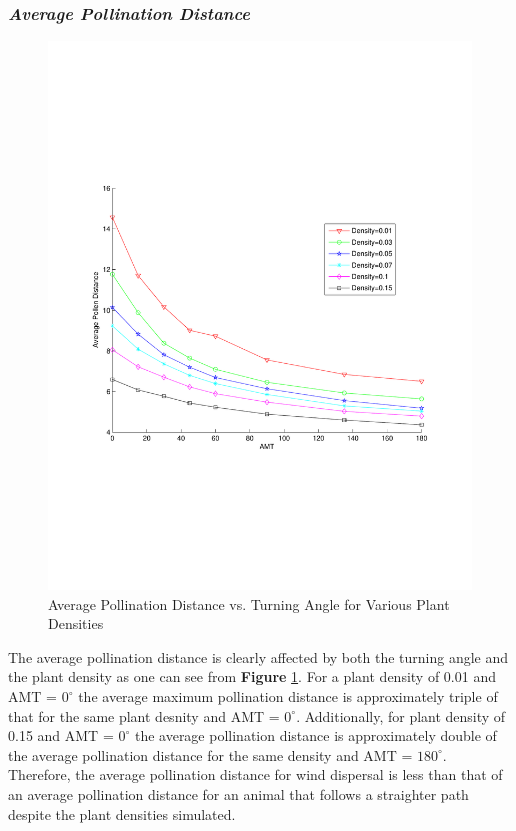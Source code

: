 \documentclass[preprint,12pt]{elsarticle}
\numberwithin{equation}{subsection}
\begin{document}
\subsubsection*{\emph{Average Pollination Distance}}
\begin{figure}
  \begin{center}
  \includegraphics[width=1.0\textwidth]{PollenDVsAMT.pdf}
  \end{center}
  \caption{\small Average Pollination Distance vs. Turning Angle for Various
Plant Densities}
  \label{AvgDist}
\end{figure}
The average pollination distance is clearly affected by both the turning angle
and the plant density as one can see from {\bf Figure} \ref{AvgDist}. For a
plant density of 0.01 and AMT = $0^\circ$ the average maximum pollination
distance is approximately triple of that for the same plant desnity and AMT =
$0^\circ$. Additionally, for plant density of 0.15 and AMT = $0^\circ$ the
average pollination distance is approximately double of the average pollination
distance for the same density and AMT = $180^\circ$. Therefore, the average
pollination distance for wind dispersal is less than that of an average
pollination distance for an animal that follows a straighter path despite the
plant densities simulated.
\end{document}

